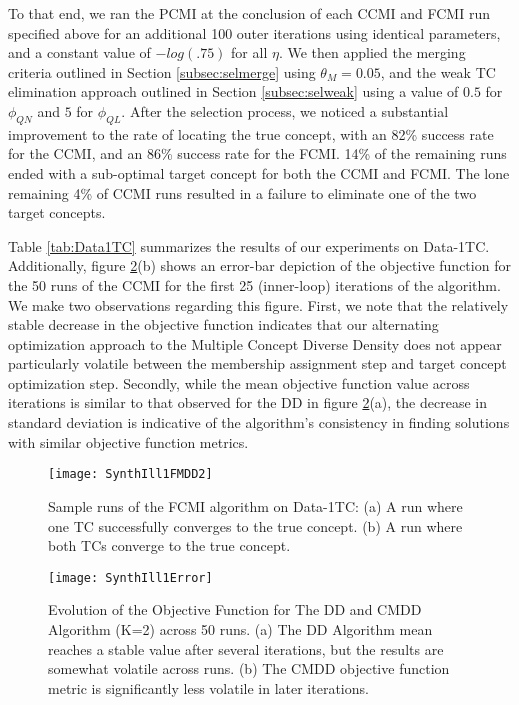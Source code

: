 \documentclass[12pt,dvips]{report}
\numberwithin{equation}{section}
\begin{document}
To that end, we ran the PCMI at the conclusion of each CCMI and FCMI run specified above for an additional 100 outer iterations using identical parameters, and a constant value of $-log(.75)$ for all $\eta$.  We then applied the merging criteria outlined in Section \ref{subsec:selmerge} using $\theta_M=0.05$, and the weak TC elimination approach outlined in Section \ref{subsec:selweak} using a value of $0.5$ for $\phi_{QN}$ and $5$ for $\phi_{QL}$.  After the selection process, we noticed a substantial improvement to the rate of locating the true concept, with an 82\% success rate for the CCMI, and an 86\% success rate for the FCMI.  14\% of the remaining runs ended with a sub-optimal target concept for both the CCMI and FCMI.  The lone remaining 4\% of CCMI runs resulted in a failure to eliminate one of the two target concepts.  

Table \ref{tab:Data1TC} summarizes the results of our experiments on Data-1TC.  Additionally, figure \ref{fig:SynthIll1Error}(b) shows an error-bar depiction of the objective function for the 50 runs of the CCMI for the first 25 (inner-loop) iterations of the algorithm.  We make two observations regarding this figure.  First, we note that the relatively stable decrease in the objective function indicates that our alternating optimization approach to the Multiple Concept Diverse Density does not appear particularly volatile between the membership assignment step and target concept optimization step.  Secondly, while the mean objective function value across iterations is similar to that observed for the DD in figure \ref{fig:SynthIll1Error}(a), the decrease in standard deviation is indicative of the algorithm's consistency in finding solutions with similar objective function metrics. 

\begin{figure}[htb]
 \texttt{[image: SynthIll1FMDD2]}
 
\caption{Sample runs of the FCMI algorithm on Data-1TC: (a) A run where one TC successfully converges to the true concept. (b) A run where both TCs converge to the true concept.}
\label{fig:SynthIll1FMDD2}
\end{figure}

\begin{figure}[htb]
 \texttt{[image: SynthIll1Error]} 
\caption{Evolution of the Objective Function for The DD and CMDD Algorithm (K=2) across 50 runs. (a) The DD Algorithm mean reaches a stable value after several iterations, but the results are somewhat volatile across runs.  (b) The CMDD objective function metric is significantly less volatile in later iterations.}
\label{fig:SynthIll1Error}
\end{figure} 
\end{document}
